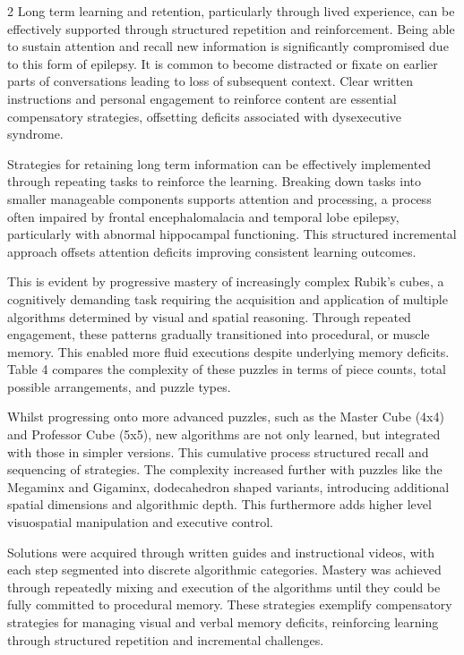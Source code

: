 \documentclass{article}
\begin{document}
\begin{multicols} {2}
Long term learning and retention, particularly through lived experience, can be effectively supported through structured repetition and reinforcement. Being able to sustain attention and recall new information is significantly compromised due to this form of epilepsy. It is common to become distracted or fixate on earlier parts of conversations leading to loss of subsequent context. Clear written instructions and personal engagement to reinforce content are essential compensatory strategies, offsetting deficits associated with dysexecutive syndrome.

Strategies for retaining long term information can be effectively implemented through repeating tasks to reinforce the learning. Breaking down tasks into smaller manageable components supports attention and processing, a process often impaired by frontal encephalomalacia and temporal lobe epilepsy, particularly with abnormal hippocampal functioning. This structured incremental approach offsets attention deficits improving consistent learning outcomes.

This is evident by progressive mastery of increasingly complex Rubik’s cubes, a cognitively demanding task requiring the acquisition and application of multiple algorithms determined by visual and spatial reasoning. Through repeated engagement, these patterns gradually transitioned into procedural, or muscle memory. This enabled more fluid executions despite underlying memory deficits. Table 4 compares the complexity of these puzzles in terms of piece counts, total possible arrangements, and puzzle types.


Whilst progressing onto more advanced puzzles, such as the Master Cube (4x4) and Professor Cube (5x5), new algorithms are not only learned, but integrated with those in simpler versions. This cumulative process structured recall and sequencing of strategies. The complexity increased further with puzzles like the Megaminx and Gigaminx, dodecahedron shaped variants, introducing additional spatial dimensions and algorithmic depth. This furthermore adds higher level visuospatial manipulation and executive control.

Solutions were acquired through written guides and instructional videos, with each step segmented into discrete algorithmic categories. Mastery was achieved through repeatedly mixing and execution of the algorithms until they could be fully committed to procedural memory. These strategies exemplify compensatory strategies for managing visual and verbal memory deficits, reinforcing learning through structured repetition and incremental challenges.
\end{multicols}
\end{document}
